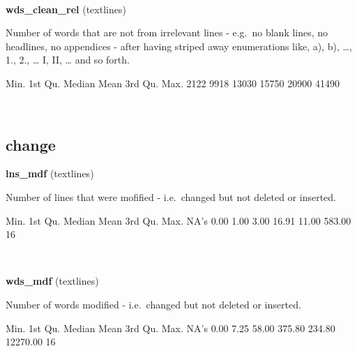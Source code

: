 \documentclass[]{article}
\newenvironment{Shaded}{\begin{snugshade}}{\end{snugshade}}
\newcommand{\DecValTok}[1]{\textcolor[rgb]{0.00,0.00,0.81}{{#1}}}
\newcommand{\StringTok}[1]{\textcolor[rgb]{0.31,0.60,0.02}{{#1}}}
\newcommand{\NormalTok}[1]{{#1}}
\begin{document}
~

\vspace{1em}

\textbf{wds\_clean\_rel} (textlines)

Number of words that are not from irrelevant lines - e.g.~no blank
lines, no headlines, no appendices - after having striped away
enumerations like, a), b), \ldots{}, 1., 2., \ldots{} I, II, \ldots{}
and so forth.

\begin{Shaded}
\begin{Highlighting}[]
   \NormalTok{Min. 1st Qu.  Median    Mean 3rd Qu.    Max. }
   \DecValTok{2122}    \DecValTok{9918}   \DecValTok{13030}   \DecValTok{15750}   \DecValTok{20900}   \DecValTok{41490} 
\end{Highlighting}
\end{Shaded}

~

\vspace{1em}

\subsection{change}\label{change}

\textbf{lns\_mdf} (textlines)

Number of lines that were mofified - i.e.~changed but not deleted or
inserted.

\begin{Shaded}
\begin{Highlighting}[]
   \NormalTok{Min. 1st Qu.  Median    Mean 3rd Qu.    Max.    NA}\StringTok{'s }
\StringTok{   0.00    1.00    3.00   16.91   11.00  583.00      16 }
\end{Highlighting}
\end{Shaded}

~

\vspace{1em}

\textbf{wds\_mdf} (textlines)

Number of words modified - i.e.~changed but not deleted or inserted.

\begin{Shaded}
\begin{Highlighting}[]
    \NormalTok{Min.  1st Qu.   Median     Mean  3rd Qu.     Max.     NA}\StringTok{'s }
\StringTok{    0.00     7.25    58.00   375.80   234.80 12270.00       16 }
\end{Highlighting}
\end{Shaded}
\end{document}

